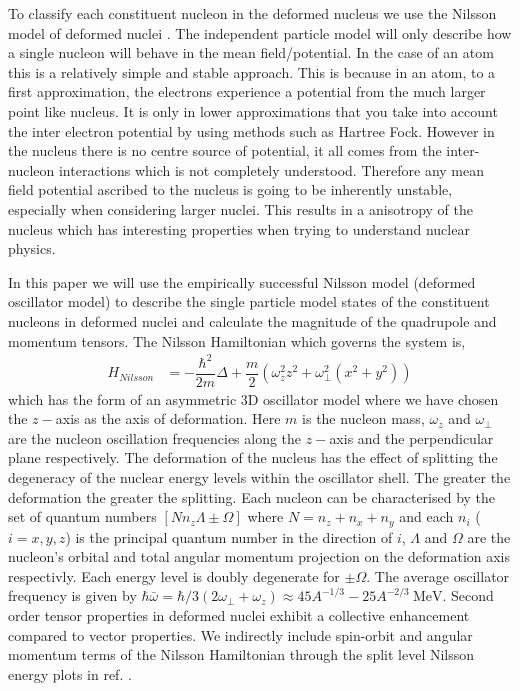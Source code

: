 \documentclass[8pt,a4paper, twoside]{report}
\begin{document}
To classify each constituent nucleon in the deformed nucleus we use the Nilsson model of deformed nuclei \cite{Nilsson1955, BohrMottVol2}. The independent particle model will only describe how a single nucleon will behave in the mean field/potential. In the case of an atom this is a relatively simple and stable approach. This is because in an atom, to a first approximation, the electrons experience a potential from the much larger point like nucleus. It is only in lower approximations that you take into account the inter electron potential by using methods such as Hartree Fock. However in the nucleus there is no centre source of potential, it all comes from the inter-nucleon interactions which is not completely understood. Therefore any mean field potential ascribed to the nucleus is going to be inherently unstable, especially when considering larger nuclei. This results in a anisotropy of the nucleus which has interesting properties when trying to understand nuclear physics.

In this paper we will use the empirically successful Nilsson model \cite{Nilsson1955, BohrMottVol2} (deformed oscillator model)  to describe the single particle model states of the constituent nucleons in deformed nuclei and calculate the magnitude of the quadrupole and momentum tensors. The Nilsson Hamiltonian which governs the system is,
\begin{align} \label{eq:NilssonHamiltonian}
H_{Nilsson} &= -\dfrac{\hbar^2}{2m}\Delta +\dfrac{m}{2}\left( \omega_z^2 z^2 + \omega_{\perp}^2\left( x^2 +  y^2\right) \right)
\end{align}
which has the form of an asymmetric 3D oscillator model where we have chosen the $z-$axis as the axis of deformation. Here $m$ is the nucleon mass, $\omega_z$ and $\omega_{\perp}$ are the nucleon oscillation frequencies along the $z-$axis and the perpendicular  plane respectively.  The deformation of the nucleus has the effect of splitting the degeneracy of the nuclear energy levels within the oscillator shell. The greater the deformation the greater the splitting. Each nucleon can be characterised by the set of quantum numbers $\left[N n_z \Lambda \pm\Omega\right]$ \cite{BohrMottVol2}  where $N = n_z + n_x + n_y$ and each $n_i$ ($i = x, y, z$) is the principal quantum number in the direction of $i$, $\Lambda$ and $\Omega$ are the nucleon's orbital and total angular momentum projection on the deformation axis respectivly. Each energy level is doubly degenerate for $\pm\Omega$. The average oscillator frequency   is given by $\hbar\bar{\omega} = \hbar/3\left(2\omega_{\perp} + \omega_z\right) \approx 45A^{-1/3} - 25A^{-2/3} \ \text{MeV}$\cite{Brown2016}. Second order tensor properties  in deformed nuclei exhibit a collective enhancement compared to vector properties. We indirectly include spin-orbit and angular momentum terms of the Nilsson Hamiltonian through the split level Nilsson energy plots in ref. \cite{BohrMottVol2}.
\end{document}
